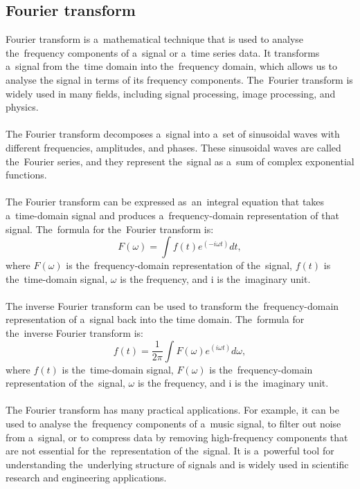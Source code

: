 \subsection{Fourier transform}\label{subsec:fourier}
Fourier transform is a~mathematical technique that is used to analyse the~frequency components of a~signal or a~time
series data. It transforms a~signal from the~time domain into the~frequency domain, which allows us to analyse the
signal in terms of its frequency components. The~Fourier transform is widely used in many fields, including signal
processing, image processing, and physics.\\
\\
The Fourier transform decomposes a~signal into a~set of sinusoidal waves with different frequencies, amplitudes, and phases.
These sinusoidal waves are called the~Fourier series, and they represent the~signal as a~sum of complex exponential functions.\\
\\
The Fourier transform can be expressed as~an~integral equation that takes a~time-domain signal and
produces a~frequency-domain representation of that signal. The~formula for the~Fourier transform is:\\
\begin{equation}
    F(\omega) = \int f(t) e^{(-i \omega t)} dt,
\end{equation}
where $F(\omega)$ is the~frequency-domain representation of the~signal, $f(t)$ is the~time-domain signal, $\omega$ is the
frequency, and i is the~imaginary unit.\\
\\
The inverse Fourier transform can be used to transform the~frequency-domain representation of a~signal back into the
time domain. The~formula for the~inverse Fourier transform is:
\begin{equation}
    f(t) = \frac{1}{2\pi} \int F(\omega) e^{(i \omega t)} d\omega,
\end{equation}
where $f(t)$ is the~time-domain signal, $F(\omega)$ is the~frequency-domain representation of the~signal, $\omega$ is the
frequency, and i is the~imaginary unit.\\
\\
The Fourier transform has many practical applications. For example, it can be used to analyse the~frequency components
of a~music signal, to filter out noise from a~signal, or to compress data by removing high-frequency components that
are not essential for the~representation of the~signal.  It is a~powerful tool for understanding the~underlying
structure of signals and is widely used in scientific research and engineering applications.

